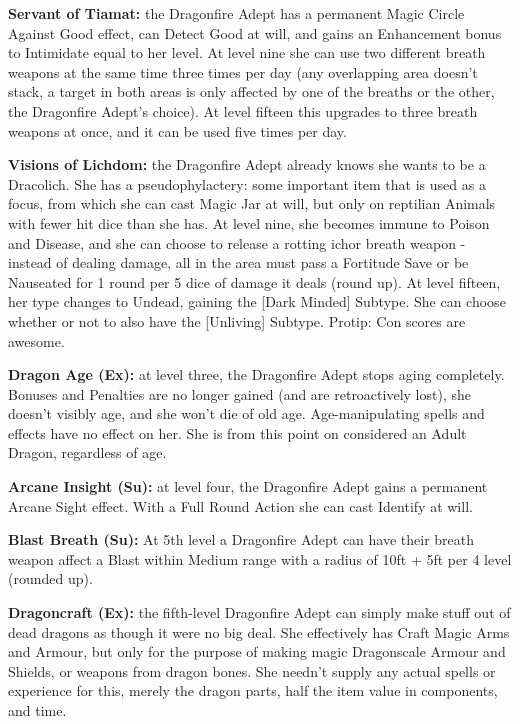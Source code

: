 \begin{itemize*}
\item \textbf{Servant of Tiamat:} the Dragonfire Adept has a permanent Magic Circle Against Good effect, can Detect Good at will, and gains an Enhancement bonus to Intimidate equal to her level. At level nine she can use two different breath weapons at the same time three times per day (any overlapping area doesn't stack, a target in both areas is only affected by one of the breaths or the other, the Dragonfire Adept's choice). At level fifteen this upgrades to three breath weapons at once, and it can be used five times per day.
\item \textbf{Visions of Lichdom:} the Dragonfire Adept already knows she wants to be a Dracolich. She has a pseudophylactery: some important item that is used as a focus, from which she can cast Magic Jar at will, but only on reptilian Animals with fewer hit dice than she has. At level nine, she becomes immune to Poison and Disease, and she can choose to release a rotting ichor breath weapon - instead of dealing damage, all in the area must pass a Fortitude Save or be Nauseated for 1 round per 5 dice of damage it deals (round up). At level fifteen, her type changes to Undead, gaining the [Dark Minded] Subtype. She can choose whether or not to also have the [Unliving] Subtype. Protip: Con scores are awesome.
\end{itemize*}

\textbf{Dragon Age (Ex):} at level three, the Dragonfire Adept stops aging completely. Bonuses and Penalties are no longer gained (and are retroactively lost), she doesn't visibly age, and she won't die of old age. Age-manipulating spells and effects have no effect on her. She is from this point on considered an Adult Dragon, regardless of age.

\textbf{Arcane Insight (Su):} at level four, the Dragonfire Adept gains a permanent Arcane Sight effect. With a Full Round Action she can cast Identify at will.

\textbf{Blast Breath (Su):} At 5th level a Dragonfire Adept can have their breath weapon affect a Blast within Medium range with a radius of 10ft + 5ft per 4 level (rounded up).

\textbf{Dragoncraft (Ex):} the fifth-level Dragonfire Adept can simply make stuff out of dead dragons as though it were no big deal. She effectively has Craft Magic Arms and Armour, but only for the purpose of making magic Dragonscale Armour and Shields, or weapons from dragon bones. She needn't supply any actual spells or experience for this, merely the dragon parts, half the item value in components, and time.


